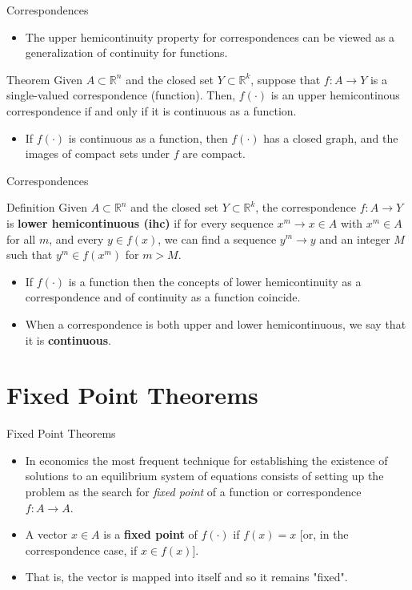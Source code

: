 \documentclass{beamer}
\begin{document}
\begin{frame}{Correspondences}
\begin{itemize}
    \item The upper hemicontinuity property for correspondences can be viewed as a generalization of continuity for functions. 
\end{itemize}
\begin{block}{Theorem}
Given $A\subset \mathbb{R}^n$ and the closed set $Y\subset \mathbb{R}^k$, suppose that $f:A\to Y$ is a single-valued correspondence (function). Then, $f(\cdot )$ is an upper hemicontinous correspondence if and only if it is continuous  as a function. 
\end{block}
\begin{itemize}
    \item If $f(\cdot )$ is continuous as a function, then $f(\cdot )$ has a closed graph, and the images of compact sets under $f$ are compact.
\end{itemize}
\end{frame}
\begin{frame}{Correspondences}
\begin{block}{Definition}
Given $A\subset \mathbb{R}^n$ and the closed set $Y\subset \mathbb{R}^k$, the correspondence $f:A\to Y$ is \textbf{lower hemicontinuous (ihc)} if for every sequence $x^m\to x\in A$ with $x^m\in A$ for all $m$, and every $y\in f(x)$, we can find a sequence $y^m\to y$ and an integer $M$ such that $y^m\in f(x^m)$ for $m>M$.
\end{block}\begin{itemize}
    \item If $f(\cdot ) $ is a function then the concepts of lower hemicontinuity as a correspondence and of continuity as a function coincide. \item When a correspondence is both upper and lower hemicontinuous, we say that it is \textbf{continuous}.
\end{itemize}
\end{frame}
\section{Fixed Point Theorems}
\begin{frame}{Fixed Point Theorems}
\begin{itemize}
    \item In economics the most frequent technique for establishing the existence of solutions to an equilibrium system of equations consists of setting up the problem as the search for \textit{fixed point} of a function or correspondence $f:A\to A$.
    \item A vector $x\in A$ is a \textbf{fixed point} of $f(\cdot )$ if $f(x)=x$ [or, in the correspondence case, if $x\in f(x)$].
    \item That is, the vector is mapped into itself and so it remains "fixed".
\end{itemize}
  \end{frame}
\end{document}
